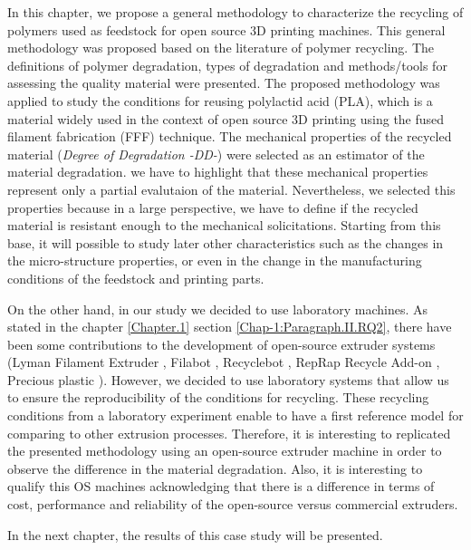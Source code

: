 In this chapter, we propose a general methodology to characterize the recycling of polymers  used 	as feedstock for open source 3D printing machines.
%
This general methodology was proposed based on the literature of polymer recycling.
%
The definitions of polymer degradation,  types of  degradation  and methods/tools for assessing the quality material were presented.
The proposed methodology was applied to study the conditions for reusing polylactid acid (PLA), which is a material widely used in the context of open source 3D printing using the fused filament fabrication (FFF) technique. 
%
The mechanical properties of the recycled material (\textit{Degree of Degradation -DD-}) were selected as an estimator of the material degradation.
we have to highlight that these mechanical properties represent only a partial evalutaion of the material. Nevertheless, we selected this properties because in a large perspective, we have to define if the recycled material is resistant enough to the mechanical solicitations.
Starting from this base, it will possible to study later other characteristics such as the changes in the micro-structure properties, or even in the change in the manufacturing conditions of the feedstock and printing parts.


On the other hand, in our study we decided to use laboratory machines. 
As stated in the chapter \ref{Chapter.1} section \ref{Chap-1:Paragraph.II.RQ2}, there have been some contributions to the development of open-source extruder systems (Lyman Filament Extruder \parencite{Lyman2014}, Filabot \parencite{McN2012}, Recyclebot \parencite{Baechler2013}, RepRap Recycle Add-on \parencite{Braanker2010}, Precious plastic \parencite{Hakkens2016}).
However, we decided to use laboratory systems that allow us to ensure the reproducibility of the conditions  for recycling. 
These recycling conditions from a laboratory experiment enable to have a first reference model for comparing to other extrusion processes.
Therefore, it is interesting to replicated the presented methodology using an open-source extruder machine in order to observe the difference in the material degradation.
Also, it is interesting to qualify this OS machines acknowledging that there is a difference in terms of cost, performance and reliability of the open-source versus commercial extruders. 

In the next chapter, the results of this case study will be presented.

